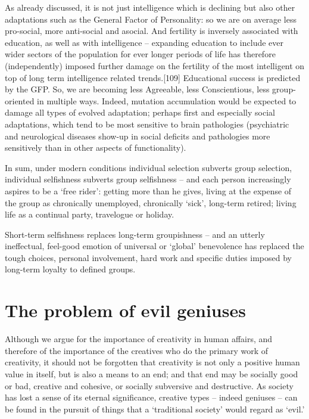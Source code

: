 \documentclass[
]{book}
\begin{document}
As already discussed, it is not just intelligence which is declining but also other adaptations such as the General Factor of Personality: so we are on average less pro-social, more anti-social and asocial. And fertility is inversely associated with education, as well as with intelligence -- expanding education to include ever wider sectors of the population for ever longer periods of life has therefore (independently) imposed further damage on the fertility of the most intelligent on top of long term intelligence related trends.{[}109{]} Educational success is predicted by the GFP. So, we are becoming less Agreeable, less Conscientious, less group-oriented in multiple ways. Indeed, mutation accumulation would be expected to damage all types of evolved adaptation; perhaps first and especially social adaptations, which tend to be most sensitive to brain pathologies (psychiatric and neurological diseases show-up in social deficits and pathologies more sensitively than in other aspects of functionality).

In sum, under modern conditions individual selection subverts group selection, individual selfishness subverts group selfishness -- and each person increasingly aspires to be a `free rider': getting more than he gives, living at the expense of the group as chronically unemployed, chronically `sick', long-term retired; living life as a continual party, travelogue or holiday.

Short-term selfishness replaces long-term groupishness -- and an utterly ineffectual, feel-good emotion of universal or `global' benevolence has replaced the tough choices, personal involvement, hard work and specific duties imposed by long-term loyalty to defined groups.

\hypertarget{the-problem-of-evil-geniuses}{%
\section{The problem of evil geniuses}\label{the-problem-of-evil-geniuses}}

Although we argue for the importance of creativity in human affairs, and therefore of the importance of the creatives who do the primary work of creativity, it should not be forgotten that creativity is not only a positive human value in itself, but is also a means to an end; and that end may be socially good or bad, creative and cohesive, or socially subversive and destructive. As society has lost a sense of its eternal significance, creative types -- indeed geniuses -- can be found in the pursuit of things that a `traditional society' would regard as `evil.'
\end{document}
